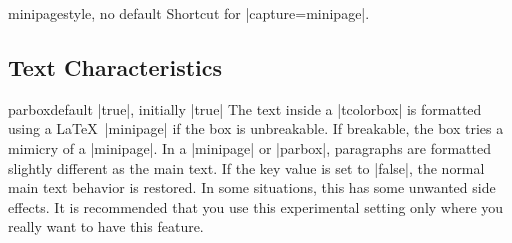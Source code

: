 \begin{docTcbKey}{minipage}{}{style, no default}
  Shortcut for |capture=minipage|.
\end{docTcbKey}


\clearpage
\subsection{Text Characteristics}
\begin{docTcbKey}[][doc updated=2015-10-14]{parbox}{}{default |true|, initially |true|}
  The text inside a |tcolorbox| is formatted using a \LaTeX\ |minipage|
  if the box is unbreakable. If breakable, the box tries a mimicry of
  a |minipage|. In a |minipage| or |parbox|, paragraphs are formatted slightly different
  as the main text. If the key value is set to |false|, the normal main text
  behavior is restored. In some situations, this has some unwanted side
  effects. It is recommended that you use this experimental setting only
  where you really want to have this feature.
\end{docTcbKey}

\begin{dispListing}

\begin{tcolorbox}[parbox,adjusted title={parbox=true (normal)}]
  \lipsum[1-2]
\end{tcolorbox}\hfill%
\begin{tcolorbox}[parbox=false,adjusted title={parbox=false}]
  \lipsum[1-2]
\end{tcolorbox}%
\end{dispListing}
{\tcbusetemp}


